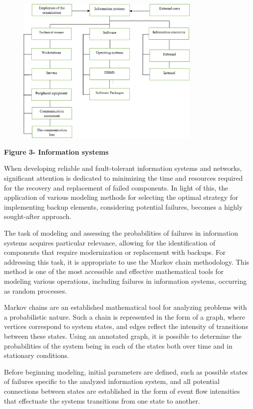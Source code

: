 \begin{figure}[H]
	\centering
	\includegraphics[width=0.8\textwidth]{assets/45}
	\caption*{}
\end{figure}

\textbf{Figure 3- Information systems}

When developing reliable and fault-tolerant information systems and
networks, significant attention is dedicated to minimizing the time and
resources required for the recovery and replacement of failed
components. In light of this, the application of various modeling
methods for selecting the optimal strategy for implementing backup
elements, considering potential failures, becomes a highly sought-after
approach.

The task of modeling and assessing the probabilities of failures in
information systems acquires particular relevance, allowing for the
identification of components that require modernization or replacement
with backups. For addressing this task, it is appropriate to use the
Markov chain methodology. This method is one of the most accessible and
effective mathematical tools for modeling various operations, including
failures in information systems, occurring as random processes.

Markov chains are an established mathematical tool for analyzing
problems with a probabilistic nature. Such a chain is represented in the
form of a graph, where vertices correspond to system states, and edges
reflect the intensity of transitions between these states. Using an
annotated graph, it is possible to determine the probabilities of the
system being in each of the states both over time and in stationary
conditions.

Before beginning modeling, initial parameters are defined, such as
possible states of failures specific to the analyzed information system,
and all potential connections between states are established in the form
of event flow intensities that effectuate the system\textquotesingle s
transitions from one state to another.

